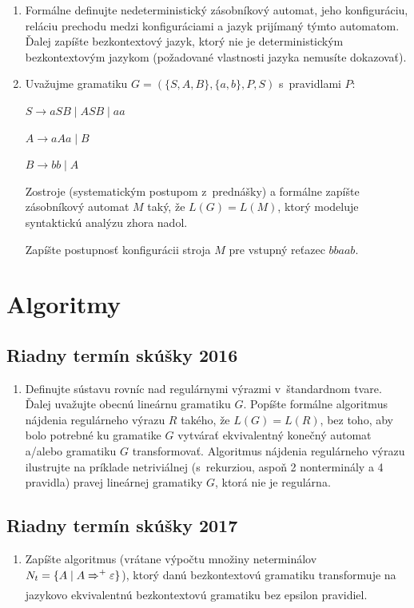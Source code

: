 \documentclass[11pt,a4paper]{article}
\begin{document}
		\begin{enumerate}
			\item Formálne definujte nedeterministický zásobníkový automat, jeho konfiguráciu, reláciu prechodu medzi konfiguráciami a jazyk prijímaný týmto automatom. Ďalej zapíšte bezkontextový jazyk, ktorý nie je deterministickým bezkontextovým jazykom (požadované vlastnosti jazyka nemusíte dokazovať).
			\item Uvažujme gramatiku $G = (\{S,A,B\}, \{a,b\}, P, S)$ s~pravidlami $P$:
			
			$S \rightarrow aSB \mid ASB \mid aa$
			
			$A \rightarrow aAa \mid B$
			
			$B \rightarrow bb \mid A$
			
			Zostroje (systematickým postupom z~prednášky) a formálne zapíšte zásobníkový automat $M$ taký, že $L(G) = L(M)$, ktorý modeluje syntaktickú analýzu zhora nadol.
			
			Zapíšte postupnosť konfigurácii stroja $M$ pre vstupný reťazec $bbaab$.
		\end{enumerate}

	\section{Algoritmy}

		\subsection{Riadny termín skúšky 2016}

		\begin{enumerate}
			\item Definujte sústavu rovníc nad regulárnymi výrazmi v~štandardnom tvare. Ďalej uvažujte obecnú lineárnu gramatiku $G$. Popíšte formálne algoritmus nájdenia regulárneho výrazu $R$ takého, že $L(G) = L(R)$, bez toho, aby bolo potrebné ku gramatike $G$ vytvárať ekvivalentný konečný automat a/alebo gramatiku $G$ transformovať. Algoritmus nájdenia regulárneho výrazu ilustrujte na príklade netriviálnej (s~rekurziou, aspoň 2 nonterminály a 4 pravidla) pravej lineárnej gramatiky $G$, ktorá nie je regulárna.
		\end{enumerate}

		\subsection{Riadny termín skúšky 2017}

		\begin{enumerate}
			\item Zapíšte algoritmus (vrátane výpočtu množiny neterminálov $N_t = \{ A \mid A \xRightarrow{}^+ \varepsilon\}$), ktorý danú bezkontextovú gramatiku transformuje na jazykovo ekvivalentnú bezkontextovú gramatiku bez epsilon pravidiel.
		\end{enumerate}
\end{document}
